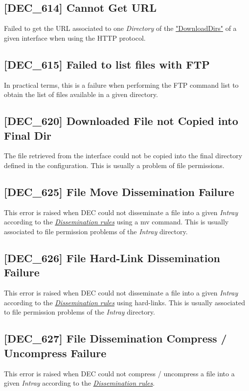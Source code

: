 \documentclass[dec_sum_main.tex]{subfiles}
\begin{document}
\label{DEC614}
\subsection{[DEC\_614] Cannot Get URL}
Failed to get the URL associated to one \textit{Directory} of the \hyperref[DownloadDirs]{"DownloadDirs"} of a given interface when using the HTTP protocol.

\label{DEC615}
\subsection{[DEC\_615] Failed to list files with FTP}
In practical terms, this is a failure when performing the FTP command list to obtain the list of files available in a given directory.

\subsection{[DEC\_620] Downloaded File not Copied into Final Dir}
\label{DEC620}
The file retrieved from the interface could not be copied into the final directory defined in the configuration. This is usually a problem of file permissions. 

\subsection{[DEC\_625] File Move Dissemination Failure}
\label{DEC625}
This error is raised when DEC could not disseminate a file into a given \textit{Intray} according to the \hyperref[Dissemination rules]{\textit{Dissemination rules}} using a mv command. This is usually associated to file permission problems of the \textit{Intray} directory.

\subsection{[DEC\_626] File Hard-Link Dissemination Failure}
\label{DEC626}
This error is raised when DEC could not disseminate a file into a given \textit{Intray} according to the \hyperref[Dissemination rules]{\textit{Dissemination rules}} using hard-links. This is usually associated to file permission problems of the \textit{Intray} directory.

\subsection{[DEC\_627] File Dissemination Compress / Uncompress Failure}
\label{DEC627}
This error is raised when DEC could not compress / uncompress a file into a given \textit{Intray} according to the \hyperref[Dissemination rules]{\textit{Dissemination rules}}.
\end{document}
